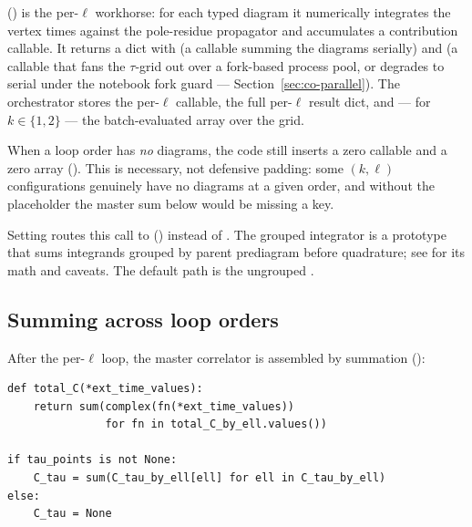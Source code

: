  ()
is the per-$\ell$ workhorse: for each typed diagram it numerically integrates the
vertex times against the pole-residue propagator and accumulates a contribution
callable. It returns a dict with  (a callable summing the diagrams
serially) and  (a callable that fans the $\tau$-grid out
over a fork-based process pool, or degrades to serial under the notebook fork
guard --- Section~\ref{sec:co-parallel}). The orchestrator stores the per-$\ell$
callable, the full per-$\ell$ result dict, and --- for $k\in\{1,2\}$ --- the
batch-evaluated array over the grid.

\begin{gotcha}
When a loop order has \emph{no} diagrams, the code still inserts a zero callable
and a zero array (). This is necessary, not
defensive padding: some $(k,\ell)$ configurations genuinely have no diagrams at a
given order, and without the placeholder the master  sum below
would be missing a key.
\end{gotcha}

\begin{note}
Setting  routes this call to
 () instead
of . The grouped integrator is a prototype that
sums integrands grouped by parent prediagram before quadrature; see
 for its math and caveats. The default path
is the ungrouped .
\end{note}

\subsection{Summing across loop orders}

After the per-$\ell$ loop, the master correlator is assembled by summation
():

\begin{lstlisting}
def total_C(*ext_time_values):
    return sum(complex(fn(*ext_time_values))
               for fn in total_C_by_ell.values())

if tau_points is not None:
    C_tau = sum(C_tau_by_ell[ell] for ell in C_tau_by_ell)
else:
    C_tau = None
\end{lstlisting}

